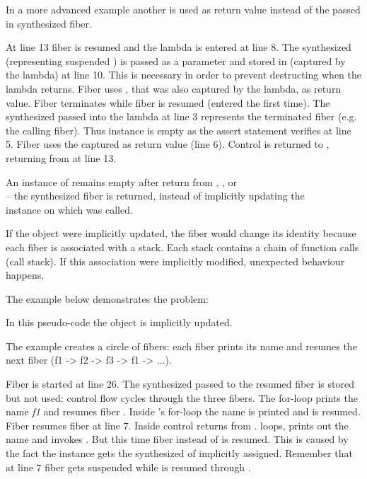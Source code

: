 In a more advanced example another \fiber is used as return value instead of the
passed in synthesized fiber.

At line 13 fiber  is resumed and the lambda is entered at line 8. The
synthesized \fiber\xspace {} (representing suspended \main) is passed as a
parameter  and stored in  (captured by the lambda) at line 10.
This is necessary in order to prevent destructing  when the lambda
returns. Fiber  uses , that was also captured by the lambda, as
return value. Fiber  terminates while fiber  is resumed (entered
the first time). The synthesized \fiber\xspace {} passed into the lambda at line 3
represents the terminated fiber  (e.g. the calling fiber). Thus instance
 is empty as the assert statement verifies at line 5. Fiber  uses
the captured \fiber\xspace {} as return value (line 6). Control is returned to
\main, returning from  at line 13.


\label{fiberreturn}
An instance of \fiber remains empty after return from \resume, \resumewith,
\xtresume or\\
\xtresumewith -- the synthesized fiber is returned, instead of
implicitly updating the\\\fiber instance on which \resume was called.

If the \fiber object were implicitly updated, the fiber would 
change its identity because each fiber is associated with a stack. Each stack
contains a chain of function calls (call stack). If this association were
implicitly modified, unexpected behaviour happens.

The example below demonstrates the problem:

In this pseudo-code the \fiber object is implicitly updated.

The example creates a circle of fibers: each fiber prints its name and resumes
the next fiber (f1 -> f2 -> f3 -> f1 -> ...).

Fiber  is started at line 26. The synthesized \fiber\xspace {} passed 
to the resumed fiber is stored but not used: control flow cycles through the three
fibers.
The for-loop prints the name \emph{f1} and resumes fiber . Inside 
's for-loop the name is printed and  is resumed. Fiber 
resumes fiber  at line 7. Inside  control returns from
.  loops, prints out the name and invokes . But
this time fiber  instead of  is resumed. This is caused by the
fact the instance  gets the synthesized \fiber of  implicitly
assigned. Remember that at line 7 fiber  gets suspended while 
is resumed through .

